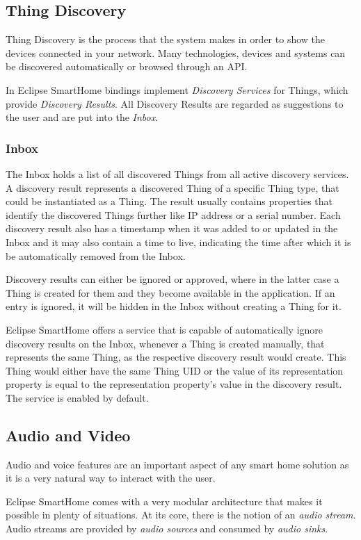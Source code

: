 \subsection{Thing Discovery}
Thing Discovery is the process that the system makes in order to show the devices connected in your network. Many technologies,
devices and systems can be discovered automatically or browsed through an API.

In Eclipse SmartHome bindings implement \textit{Discovery Services} for Things, which provide \textit{Discovery Results}. All Discovery
Results are regarded as suggestions to the user and are put into the \textit{Inbox}.

\subsubsection{Inbox}
The Inbox holds a list of all discovered Things from all active discovery services. A discovery result represents a discovered Thing of a
specific Thing type, that could be instantiated as a Thing. The result usually contains properties that identify the discovered Things
further like IP address or a serial number. Each discovery result also has a timestamp when it was added to or updated in the Inbox
and it may also contain a time to live, indicating the time after which it is be automatically removed from the Inbox.

Discovery results can either be ignored or approved, where in the latter case a Thing is created for them and they become available in
the application. If an entry is ignored, it will be hidden in the Inbox without creating a Thing for it.

Eclipse SmartHome offers a service that is capable of automatically ignore discovery results on the Inbox, whenever a Thing is created
manually, that represents the same Thing, as the respective discovery result would create. This Thing would either have the same Thing
UID or the value of its representation property is equal to the representation property's value in the discovery result. The service is
enabled by default.

\subsection{Audio and Video}
Audio and voice features are an important aspect of any smart home solution as it is a very natural way to interact with the user.

Eclipse SmartHome comes with a very modular architecture that makes it possible in plenty of situations. At its core, there is the notion
of an \textit{audio stream}. Audio streams are provided by \textit{audio sources} and consumed by \textit{audio sinks}.

